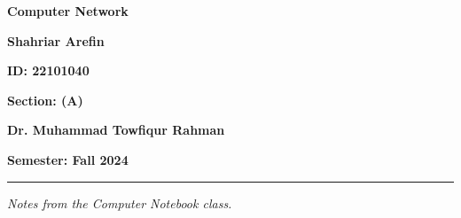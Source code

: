 \begin{titlepage}
   \centering
   \vspace*{1.5cm}
   
   {\Huge {}\par}
   {\Huge\bfseries Computer Network\par}
   \vspace{1.5cm}
   
   {\LARGE {}\par}
   {\LARGE\textbf{Shahriar Arefin}\par}
   \vspace{0.5cm}
   {\large\textbf{ID: 22101040}\par}
   \vspace{0.5cm}
   {\large\textbf{Section: (A)}\par}

   \vspace{1cm}
   {\LARGE {}\par}
   {\LARGE\textbf{Dr. Muhammad Towfiqur Rahman}\par}
   \vfill

   {\large\textbf{Semester: Fall 2024}\par}
   \vspace{1cm}

   \hrule \vspace{0.2cm}
   {\small \textit{Notes from the Computer Notebook class.}}
   \normalsize
\end{titlepage}
